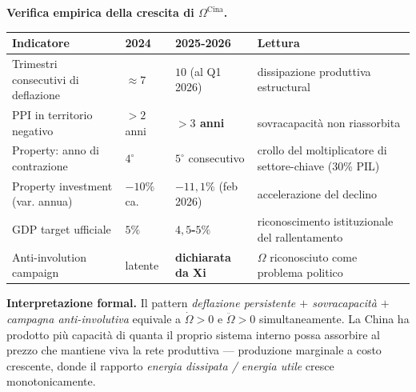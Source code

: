 \Proved{} \textbf{Verifica empirica della crescita di
\(\Omega^{\text{Cina}}\).}

{\def\LTcaptype{none} %
{\small\begin{longtable}[]{@{}
  >{\raggedright\arraybackslash}p{}
  >{\raggedright\arraybackslash}p{}
  >{\raggedright\arraybackslash}p{}
  >{\raggedright\arraybackslash}p{}@{}}
\toprule\noalign{}
\begin{minipage}[b]{\linewidth}\raggedright
Indicatore
\end{minipage} & \begin{minipage}[b]{\linewidth}\raggedright
2024
\end{minipage} & \begin{minipage}[b]{\linewidth}\raggedright
2025-2026
\end{minipage} & \begin{minipage}[b]{\linewidth}\raggedright
Lettura
\end{minipage} \\
\midrule\noalign{}
\endhead
\bottomrule\noalign{}
\endlastfoot
Trimestri consecutivi di deflazione & \(\approx 7\) & \textbf{\(10\)}
(al Q1 2026) & dissipazione produttiva estructural \\
PPI in territorio negativo & \(> 2\) anni & \textbf{\(> 3\) anni} &
sovracapacità non riassorbita \\
Property: anno di contrazione & \(4^\circ\) & \textbf{\(5^\circ\)} consecutivo &
crollo del moltiplicatore di settore-chiave (30\% PIL) \\
Property investment (var. annua) & \(-10\%\) ca. &
\textbf{\(-11{,}1\%\)} (feb 2026) & accelerazione del declino \\
GDP target ufficiale & \(5\%\) & \textbf{\(4{,}5\)-\(5\%\)} &
riconoscimento istituzionale del rallentamento \\
Anti-involution campaign & latente & \textbf{dichiarata da Xi} &
\(\Omega\) riconosciuto come problema politico \\
\end{longtable}}
}

\Hypoth{} \textbf{Interpretazione formal.} Il pattern \emph{deflazione
persistente \(+\) sovracapacità \(+\) campagna anti-involutiva} equivale
a \(\dot\Omega > 0\) e \(\ddot\Omega > 0\) simultaneamente. La China ha
prodotto più capacità di quanta il proprio sistema interno possa
assorbire al prezzo che mantiene viva la rete produttiva --- produzione
marginale a costo crescente, donde il rapporto \emph{energia dissipata /
energia utile} cresce monotonicamente.

